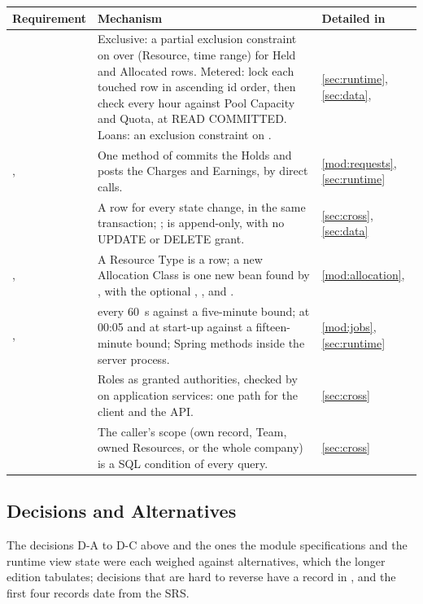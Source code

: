 {\small\renewcommand{\arraystretch}{1.06}
\begin{tabularx}{\textwidth}{@{}L{2.0cm}YL{2.4cm}@{}}
\toprule
\textbf{Requirement} & \textbf{Mechanism} & \textbf{Detailed in} \\
\midrule
{} & Exclusive: a partial exclusion constraint on  over (Resource, time range) for Held and Allocated rows. Metered: lock each touched  row in ascending id order, then check every hour against Pool Capacity and Quota, at READ COMMITTED. Loans: an exclusion constraint on . & \ref{sec:runtime}, \ref{sec:data},  \\
,  & One  method of  commits the Holds and posts the Charges and Earnings, by direct calls. & \ref{mod:requests}, \ref{sec:runtime} \\
 & A  row for every state change, in the same transaction; ;  is append-only, with no UPDATE or DELETE grant. & \ref{sec:cross}, \ref{sec:data} \\
,  & A Resource Type is a row; a new Allocation Class is one new  bean found by , with the optional , , and . & \ref{mod:allocation},  \\
,  &  every 60~s against a five-minute bound;  at 00:05 and at start-up against a fifteen-minute bound; Spring  methods inside the server process. & \ref{mod:jobs}, \ref{sec:runtime} \\
 & Roles as granted authorities, checked by  on application services: one path for the client and the API. & \ref{sec:cross} \\
 & The caller's scope (own record, Team, owned Resources, or the whole company) is a SQL condition of every query. & \ref{sec:cross} \\
\bottomrule
\end{tabularx}
}

\subsection{Decisions and Alternatives}

The decisions D-A to D-C above and the ones the module specifications and the runtime view state were each weighed against alternatives, which the longer edition tabulates; decisions that are hard to reverse have a record in , and the first four records date from the SRS.

